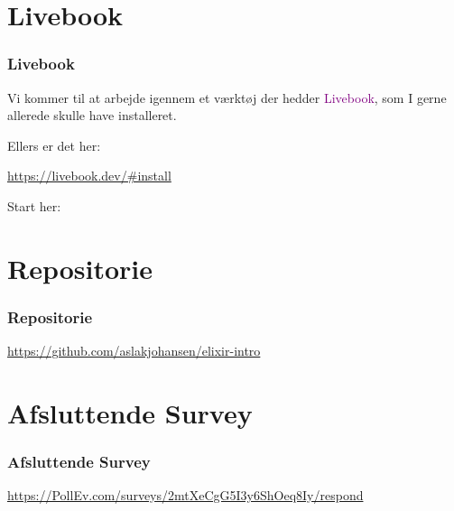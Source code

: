 \section{Livebook}
\begin{frame}
    \frametitle{Livebook}
    \vspace{5mm}
    Vi kommer til at arbejde igennem et værktøj der hedder \textcolor{purple}{Livebook}, som I gerne allerede skulle have installeret.
    
    \vspace{7mm}
    Ellers er det her:
    \begin{center}
      \url{https://livebook.dev/\#install}
    \end{center}
    
    \vspace{7mm}
    Start her:
    \begin{center}
    \end{center}
\end{frame}

\section{Repositorie}
\begin{frame}
    \frametitle{Repositorie}
    \begin{center}
    
      \vspace{4mm}
      \url{https://github.com/aslakjohansen/elixir-intro}
    \end{center}
\end{frame}

\section{Afsluttende Survey}
\begin{frame}
    \frametitle{Afsluttende Survey}
    \begin{center}
    
      \vspace{4mm}
      \url{https://PollEv.com/surveys/2mtXeCgG5I3y6ShOeq8Iy/respond}
    \end{center}
\end{frame}

